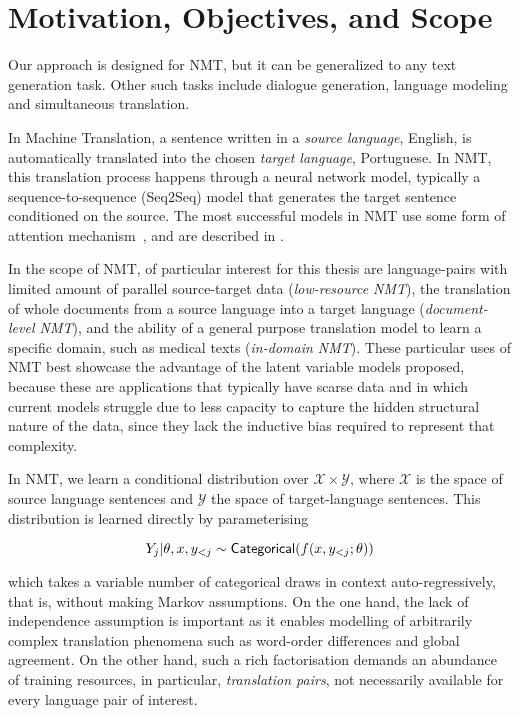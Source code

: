 \section{Motivation, Objectives, and Scope}
\label{sec:int_motivation}

Our approach is designed for NMT, but it can be generalized to any
text generation task. Other such tasks include dialogue generation,
language modeling and simultaneous translation.

In Machine Translation, a sentence written in a {\it source
        language}, \eg English, is automatically translated into the chosen
    {\it target language}, \eg Portuguese. In NMT, this translation
process happens through a neural network model, typically a
sequence-to-sequence (Seq2Seq) model that generates the target
sentence conditioned on the source. The most successful models in NMT
use some form of attention
mechanism~\citep{bahdanau2014neural,vaswani2017attention}, and are
described in .

In the scope of NMT, of particular interest for this thesis are
language-pairs with limited amount of parallel source-target data
({\it low-resource NMT}), the translation of whole documents from a
source language into a target language ({\it document-level NMT}),
and the ability of a general purpose translation model to learn a
specific domain, such as medical texts ({\it in-domain NMT}). These
particular uses of NMT best showcase the advantage of the latent
variable models proposed, because these are applications that
typically have scarse data and in which current models struggle due
to less capacity to capture the hidden structural nature of the data,
since they lack the inductive bias required to represent that
complexity.

In NMT, we learn a conditional distribution over $\mathcal X \times
    \mathcal Y$, where $\mathcal X$ is the space of source language
sentences and $\mathcal{Y}$ the space of target-language sentences.
This distribution is learned directly by parameterising

\begin{equation}
    Y_j|\theta, x, y_{<j} \sim \operatorname{\mathsf{Categorical}}(f(x, y_{<j}; \theta))
    \label{eq:nmt_factorize}
\end{equation}

\noindent which takes a variable number of categorical draws in
context auto-regressively, that is, without making Markov
assumptions. On the one hand, the lack of independence assumption is
important as it enables modelling of arbitrarily complex translation
phenomena such as word-order differences and global agreement. On the
other hand, such a rich factorisation demands an abundance of
training resources, in particular, \emph{translation pairs}, not
necessarily available for every language pair of interest.

